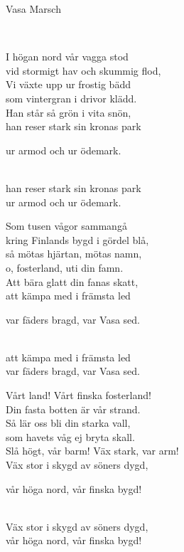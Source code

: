 \begin{song}{Vasa Marsch}
	
	\\
	
	
	I högan nord vår vagga stod\\
	vid stormigt hav och skummig flod,\\
	Vi växte upp ur frostig bädd\\
	som vintergran i drivor klädd.\\   
    Han står så grön i vita snön,\\
    han reser stark sin kronas park\\
	\begin{repetition}
		ur armod och ur ödemark.
	\end{repetition}\\
	han reser stark sin kronas park\\
	ur armod och ur ödemark.

	Som tusen vågor sammangå\\
	kring Finlands bygd i gördel blå,\\
	så mötas hjärtan, mötas namn,\\
	o, fosterland, uti din famn.\\  
    Att bära glatt din fanas skatt,\\
    att kämpa med i främsta led\\
	\begin{repetition}
		var fäders bragd, var Vasa sed.
	\end{repetition}\\
	att kämpa med i främsta led\\
	var fäders bragd, var Vasa sed.	
	
	
	Vårt land! Vårt finska fosterland!\\
	Din fasta botten är vår strand.\\
	Så lär oss bli din starka vall,\\
	som havets våg ej bryta skall.\\
    Slå högt, vår barm! Väx stark, var arm!\\
    Väx stor i skygd av söners dygd,\\
    \begin{repetition}
		vår höga nord, vår finska bygd!
	\end{repetition}\\
	Väx stor i skygd av söners dygd,\\
	vår höga nord, vår finska bygd!
	
\end{song}
